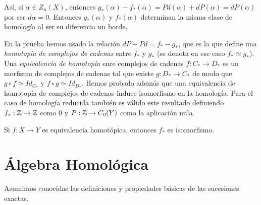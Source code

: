\documentclass[TA.tex]{subfiles}
\begin{document}
\begin{dem}
Así, si $\alpha\in Z_n(X)$, entonces $g_*(\alpha)-f_*(\alpha)=Pd(\alpha)+dP(\alpha)=dP(\alpha)$ por ser $d\alpha=0$. Entonces $g_*(\alpha)$ y $f_*(\alpha)$ determinan la misma clase de homología al ser su diferencia un borde. 
\end{dem}

En la prueba hemos usado la relación $dP-Pd=f_*-g_*$, que es la que define una \emph{homotopía de complejos de cadenas} entre $f_*$ y $g_*$ (se denota en ese caso $f_*\simeq g_*$). Una \emph{equivalencia de homotopía} enre complejos de cadenas $f:C_*\to D_*$ es un morfismo de complejos de cadenas tal que existe $g:D_*\to C_*$ de modo que $g\circ f\simeq Id_{C_*}$ y $f\circ g\simeq Id_{D_*}$.  Hemos probado además que una equivalencia de homotopía de complejos de cadenas induce isomorfismo en la homología. Para el caso de homología reducida también es válido este resultado definiendo $f_*:\mathbb{Z}\to\mathbb{Z}$ como 0 y $P:\mathbb{Z}\to C_0(Y)$ como la aplicación nula.

\begin{coro}
Si $f:X\to Y$ es equivalencia homotópica, entonces $f_*$ es isomorfismo.
\end{coro}

\section{Álgebra Homológica}

Asumimos conocidas las definiciones y propiedades básicas de las sucesiones exactas. 
\end{document}
